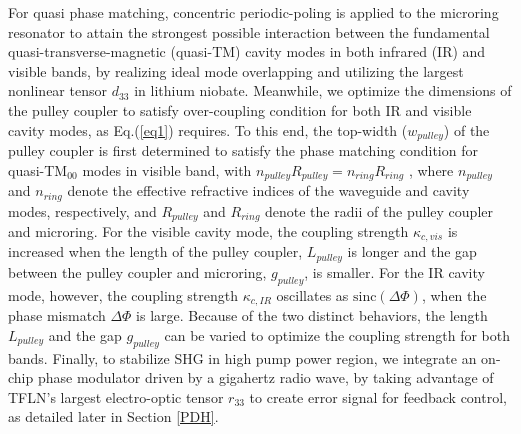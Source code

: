 \documentclass{WileyMSP-template}
\begin{document}
For quasi phase matching, concentric periodic-poling is applied to the microring resonator to attain the strongest possible interaction between the fundamental quasi-transverse-magnetic (quasi-TM) cavity modes in both infrared (IR) and visible bands, by realizing ideal mode overlapping and utilizing the largest nonlinear tensor $d_{33}$ in lithium niobate. Meanwhile, we optimize the dimensions of the pulley coupler to satisfy over-coupling condition for both IR and visible cavity modes, as Eq.(\ref{eq1}) requires. To this end, the top-width ($w_{pulley}$) of the pulley coupler is first determined to satisfy the phase matching condition for quasi-TM$_{00}$ modes in visible band, with $n_{pulley} R_{pulley} = n_{ring} R_{ring} $ \cite{hosseini2010systematic}, where $n_{pulley}$ and $n_{ring}$ denote the effective refractive indices of the waveguide and cavity modes, respectively, and $R_{pulley}$ and $R_{ring}$ denote the radii of the pulley coupler and microring. For the visible cavity mode, the coupling strength $\kappa_{c,vis}$ is increased when the length of the pulley coupler, $L_{pulley}$ is longer and the gap  between the pulley coupler and microring, $g_{pulley}$, is smaller. For the IR cavity mode, however, the coupling strength $\kappa_{c, IR}$ oscillates as $\mathrm{sinc}(\Delta\Phi)$, when the phase mismatch $\Delta\Phi$ is large. Because of the two distinct behaviors, the length $L_{pulley}$ and the gap $g_{pulley}$ can be varied to optimize the coupling strength for both bands. Finally, to stabilize SHG in high pump power region, we integrate an on-chip phase modulator driven by a gigahertz radio wave, by taking advantage of TFLN's largest electro-optic tensor $r_{33}$ to create error signal for feedback control, as detailed later in Section \ref{PDH}. \\
\end{document}
